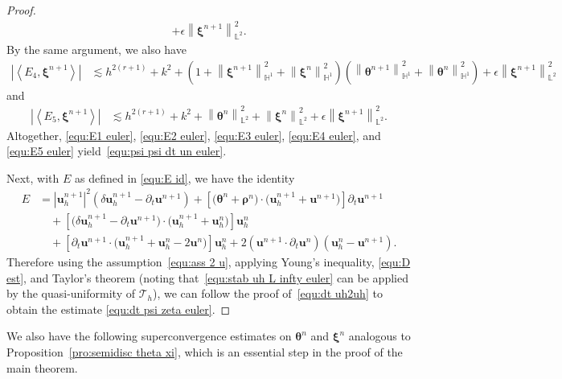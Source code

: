 \documentclass[11pt, reqno]{amsart}
\theoremstyle{definition}
\theoremstyle{remark}
\numberwithin{equation}{section}
\newcommand{\bff}{\boldsymbol}
\newcommand{\bb}{\mathbb}
\newcommand{\norm}[2]{\left\|{#1}\right\|_{#2}}
\newcommand{\inpro}[2]{\left\langle#1,#2\right\rangle}
\newcommand{\abs}[1]{\left|{#1}\right|}
\begin{document}
\begin{proof}
\begin{align}
		+
		\epsilon \norm{\bff{\xi}^{n+1}}{\bb{L}^2}^2.
	\end{align}
	By the same argument, we also have
	\begin{align}\label{equ:E4 euler}
		\left|\inpro{E_4}{\bff{\xi}^{n+1}}\right|
		&\lesssim
		h^{2(r+1)} + k^2
		+
		\left(1+ \norm{\bff{\xi}^{n+1}}{\bb{H}^1}^2 + \norm{\bff{\xi}^n}{\bb{H}^1}^2\right) \left(\norm{\bff{\theta}^{n+1}}{\bb{H}^1}^2 + \norm{\bff{\theta}^n}{\bb{H}^1}^2 \right)
		+
		\epsilon \norm{\bff{\xi}^{n+1}}{\bb{L}^2}^2
	\end{align}
	and
	\begin{align}\label{equ:E5 euler}
		\left|\inpro{E_5}{\bff{\xi}^{n+1}}\right|
		&\lesssim
		h^{2(r+1)} + k^2
		+
		\norm{\bff{\theta}^n}{\bb{L}^2}^2
		+
		\norm{\bff{\xi}^n}{\bb{L}^2}^2
		+
		\epsilon\norm{\bff{\xi}^{n+1}}{\bb{L}^2}^2.
	\end{align}
	Altogether, \eqref{equ:E1 euler}, \eqref{equ:E2 euler}, \eqref{equ:E3 euler}, \eqref{equ:E4 euler}, and \eqref{equ:E5 euler} yield~\eqref{equ:psi psi dt un euler}.
	
	Next, with $E$ as defined in \eqref{equ:E id}, we have the identity
	\begin{align*}
		E&=
		\abs{\bff{u}_h^{n+1}}^2 \left(\delta \bff{u}_h^{n+1}-\partial_t \bff{u}^{n+1}\right)
		+
		\left[ \big(\bff{\theta}^n+\bff{\rho}^n\big)\cdot \big(\bff{u}_h^{n+1}+\bff{u}^{n+1}\big)\right] \partial_t \bff{u}^{n+1}
		\\
		&\quad
		+
		\left[ \big(\delta \bff{u}_h^{n+1}-\partial_t \bff{u}^{n+1}\big)\cdot \big(\bff{u}_h^{n+1}+\bff{u}_h^n\big)\right] \bff{u}_h^n
		\\
		&\quad
		+
		\left[\partial_t \bff{u}^{n+1} \cdot \big(\bff{u}_h^{n+1}+\bff{u}_h^n-2\bff{u}^n\big) \right] \bff{u}_h^n
		+
		2 \left(\bff{u}^{n+1}\cdot \partial_t \bff{u}^n\right) \left(\bff{u}_h^n-\bff{u}^{n+1}\right).
	\end{align*}
	Therefore using the assumption~\eqref{equ:ass 2 u}, applying Young's inequality, \eqref{equ:D est}, and Taylor's theorem (noting that~\eqref{equ:stab uh L infty euler} can be applied by the quasi-uniformity of $\mathcal{T}_h$), we can follow the proof of~\eqref{equ:dt uh2uh} to obtain the estimate \eqref{equ:dt psi zeta euler}.
\end{proof}

We also have the following superconvergence estimates on $\bff{\theta}^n$ and $\bff{\xi}^n$ analogous to Proposition~\ref{pro:semidisc theta xi}, which is an essential step in the proof of the main theorem.
\end{document}
